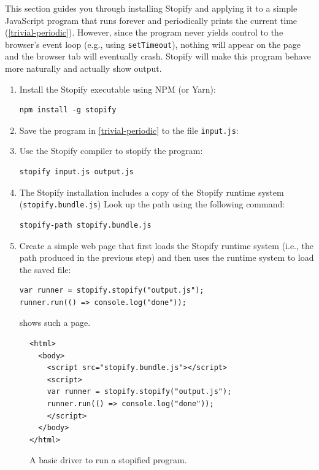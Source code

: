 \documentclass[10pt]{book}
\begin{document}
This section guides you through installing Stopify and applying it to a simple
JavaScript program that runs forever and periodically prints the current time
(\cref{trivial-periodic}). However, since the program never yields
control to the browser's event loop (e.g., using \texttt{setTimeout}), nothing
will appear on the page and the browser tab will eventually crash. Stopify will
make this program behave more naturally and actually show output.

\begin{enumerate}

\item Install the Stopify executable using NPM (or Yarn):
\lstset{language=console}
\begin{lstlisting}
npm install -g stopify
\end{lstlisting}

\item Save the program in \cref{trivial-periodic} to the file
 \texttt{input.js}:


\item Use the Stopify compiler to stopify the program:

\lstset{language=console}
\begin{lstlisting}
stopify input.js output.js
\end{lstlisting}

\item The Stopify installation includes a copy of the Stopify runtime system
(\texttt{stopify.bundle.js})
Look up the path using the following command:

\lstset{language=console}
\begin{lstlisting}
stopify-path stopify.bundle.js
\end{lstlisting}


\item Create a simple web page
that first loads the Stopify runtime system (i.e., the path produced
in the previous step) and then uses the runtime system to load the saved
file:
\lstset{language=console}
\begin{lstlisting}
var runner = stopify.stopify("output.js");
runner.run(() => console.log("done"));
\end{lstlisting}

 shows such a page.

\end{enumerate}

\begin{figure}
\lstset{language=console}
\begin{lstlisting}
<html>
  <body>
    <script src="stopify.bundle.js"></script>
    <script>
    var runner = stopify.stopify("output.js");
    runner.run(() => console.log("done"));
    </script>
  </body>
</html>
\end{lstlisting}
\caption{A basic driver to run a stopified program.\label{trivial-driver}}
\end{figure}
  
\end{document}

